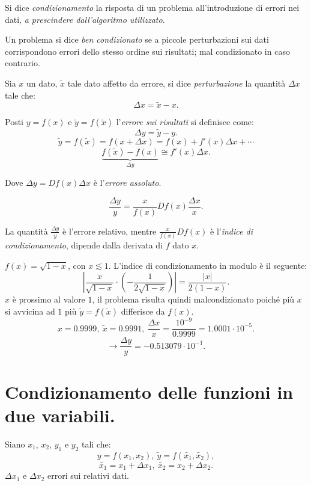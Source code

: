 \begin{defi}
Si dice \emph{condizionamento} la risposta di un problema all'introduzione di 
errori nei dati, \emph{a prescindere dall'algoritmo utilizzato}.
\end{defi}

\begin{defi}
Un problema si dice \emph{ben condizionato} se a piccole perturbazioni sui dati 
corrispondono errori dello stesso ordine sui risultati; mal condizionato in
caso contrario.
\end{defi}

\begin{defi}
Sia $x$ un dato, $\tilde{x}$ tale dato affetto da errore, si dice
\emph{perturbazione} la quantità $\Delta x$ tale che:
\[\Delta x = \tilde{x} - x.\]

Posti $y = f(x)$ e $\tilde{y} = f(\tilde{x})$ l'\emph{errore sui risultati} si
definisce come:
\[\Delta y = \tilde{y} - y.\]
\[\tilde{y} = f(\tilde{x}) = f(x + \Delta x) = f(x) + f'(x)\Delta x + 
\cdots\]
\[\underbrace{f(\tilde{x}) - f(x)}_{\Delta y} \cong f'(x)\Delta x. \]

Dove $\Delta y = Df(x)\Delta x$ è l'\emph{errore assoluto}.

\[\frac{\Delta y}{y} = \frac{x}{f(x)}Df(x)\frac{\Delta x}{x}.\]

La quantità $\frac{\Delta y}{y}$ è l'errore relativo, mentre $\frac{x}{f(x)}
Df(x)$ è l'\emph{indice di condizionamento}, dipende dalla derivata di $f$
dato $x$.
\end{defi} 

\begin{exe}
$f(x) = \sqrt{1 - x}$, con $x \lesssim 1$. L'indice di condizionamento in 
modulo è il seguente:
\[
\left| \frac{x}{\sqrt{1 - x}}\cdot 
\left(-\frac{1}{2\sqrt{1 - x}}\right)\right| = \frac{|x|}{2(1-x)}.
\]
$x$ è prossimo al valore $1$, il problema risulta quindi malcondizionato
poiché più $x$ si avvicina ad $1$ più $\tilde{y} = f(\tilde{x})$ differisce
da $f(x)$.
\[
x = 0.9999, \ \tilde{x} = 0.9991, \ \frac{\Delta x}{x} = 
\frac{10^{-9}}{0.9999} = 1.0001 \cdot 10^{-5}.
\]
\[\longrightarrow \frac{\Delta y}{y} = -0.513079 \cdot 10^{-1}.\]
\end{exe}

\section{Condizionamento delle funzioni in due variabili.}
Siano $x_1$, $x_2$, $y_1$ e $y_2$ tali che:
\[y = f(x_1,x_2), \ \tilde{y} = f(\tilde{x_1},\tilde{x_2}), \]
\[
\tilde{x_1}= x_1 + \Delta x_1,\ \tilde{x_2}= x_2 + \Delta x_2.
\]
$\Delta x_1$ e $\Delta x_2$ errori sui relativi dati.

